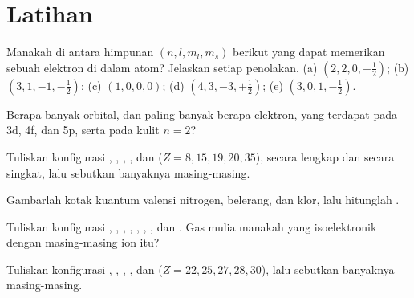 \section{Latihan}

\begin{exercise}[$\star$]\label{exo:b1:quantum-numbers:1}
Manakah di antara himpunan $(n, l, m_l, m_s)$ berikut yang dapat
memerikan sebuah elektron di dalam atom? Jelaskan setiap penolakan.
(a) $(2, 2, 0, +\tfrac12)$; (b) $(3, 1, -1, -\tfrac12)$;
(c) $(1, 0, 0, 0)$; (d) $(4, 3, -3, +\tfrac12)$; (e) $(3, 0, 1, -\tfrac12)$.
\end{exercise}

\begin{exercise}[$\star$]\label{exo:b1:quantum-numbers:2}
Berapa banyak orbital, dan paling banyak berapa elektron, yang terdapat
pada  3d, 4f, dan 5p, serta pada kulit $n = 2$?
\end{exercise}

\begin{exercise}[$\star$]\label{exo:b1:quantum-numbers:3}
Tuliskan konfigurasi  , , , , dan
 ($Z = 8, 15, 19, 20, 35$), secara lengkap dan secara singkat, lalu
sebutkan banyaknya  masing-masing.
\end{exercise}

\begin{exercise}[$\star$]\label{exo:b1:quantum-numbers:4}
Gambarlah kotak kuantum  valensi nitrogen, belerang, dan klor,
lalu hitunglah .
\end{exercise}

\begin{exercise}[$\star\star$]\label{exo:b1:quantum-numbers:5}
Tuliskan konfigurasi , , , ,
, , , dan . Gas mulia manakah
yang isoelektronik dengan masing-masing ion itu?
\end{exercise}

\begin{exercise}[$\star\star$]\label{exo:b1:quantum-numbers:6}
Tuliskan konfigurasi , , ,
, dan  ($Z = 22, 25, 27, 28, 30$), lalu sebutkan
banyaknya  masing-masing.
\end{exercise}

